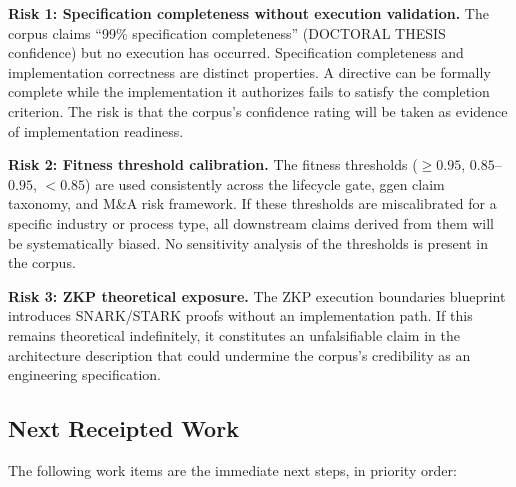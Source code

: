 \textbf{Risk 1: Specification completeness without execution validation.}
The corpus claims ``99\% specification completeness'' (DOCTORAL THESIS confidence)
but no execution has occurred. Specification completeness and implementation
correctness are distinct properties. A directive can be formally complete while the
implementation it authorizes fails to satisfy the completion criterion. The risk is
that the corpus's confidence rating will be taken as evidence of implementation
readiness.

\textbf{Risk 2: Fitness threshold calibration.}
The fitness thresholds ($\geq 0.95$, $0.85$--$0.95$, $< 0.85$) are used consistently
across the lifecycle gate, ggen claim taxonomy, and M\&A risk framework. If these
thresholds are miscalibrated for a specific industry or process type, all downstream
claims derived from them will be systematically biased. No sensitivity analysis of
the thresholds is present in the corpus.

\textbf{Risk 3: ZKP theoretical exposure.}
The ZKP execution boundaries blueprint introduces SNARK/STARK proofs without an
implementation path. If this remains theoretical indefinitely, it constitutes an
unfalsifiable claim in the architecture description that could undermine the corpus's
credibility as an engineering specification.

\subsection{Next Receipted Work}
\label{sec:prompts-open-questions-next}

The following work items are the immediate next steps, in priority order:

